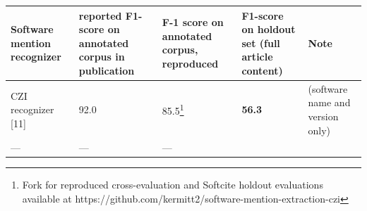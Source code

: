 \documentclass[
]{article}
\begin{document}
\begin{longtable}[]{@{}lllll@{}}
\toprule
\begin{minipage}[b]{0.18\columnwidth}\raggedright
Software mention recognizer\strut
\end{minipage} & \begin{minipage}[b]{0.18\columnwidth}\raggedright
reported F1-score on annotated corpus in publication\strut
\end{minipage} & \begin{minipage}[b]{0.18\columnwidth}\raggedright
F-1 score on annotated corpus, reproduced\strut
\end{minipage} & \begin{minipage}[b]{0.18\columnwidth}\raggedright
\textbf{F1-score on holdout set} (full article content)\strut
\end{minipage} & \begin{minipage}[b]{0.12\columnwidth}\raggedright
Note\strut
\end{minipage}\tabularnewline
\midrule
\endhead
\begin{minipage}[t]{0.18\columnwidth}\raggedright
CZI recognizer {[}11{]}\strut
\end{minipage} & \begin{minipage}[t]{0.18\columnwidth}\raggedright
92.0\strut
\end{minipage} & \begin{minipage}[t]{0.18\columnwidth}\raggedright
85.5\footnote{Fork for reproduced cross-evaluation and Softcite holdout
  evaluations available at
  https://github.com/kermitt2/software-mention-extraction-czi}\strut
\end{minipage} & \begin{minipage}[t]{0.18\columnwidth}\raggedright
\textbf{56.3}\strut
\end{minipage} & \begin{minipage}[t]{0.12\columnwidth}\raggedright
(software name and version only)\strut
\end{minipage}\tabularnewline
\begin{minipage}[t]{0.18\columnwidth}\raggedright
---\strut
\end{minipage} & \begin{minipage}[t]{0.18\columnwidth}\raggedright
---\strut
\end{minipage} & \begin{minipage}[t]{0.18\columnwidth}\raggedright
---\strut
\end{minipage} & \begin{minipage}[t]{0.18\columnwidth}\raggedright

\end{minipage}
\end{longtable}
\end{document}
